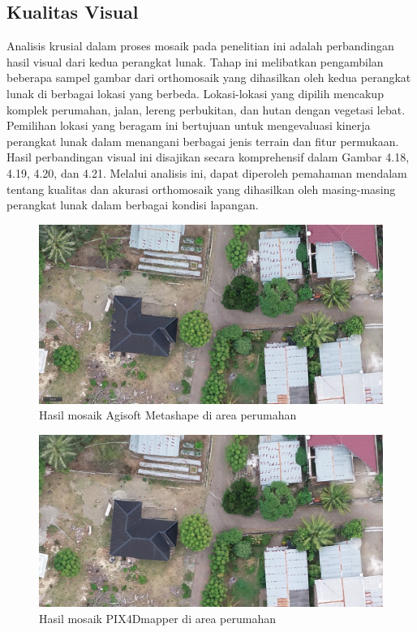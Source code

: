 \subsection{Kualitas Visual}

Analisis krusial dalam proses mosaik pada penelitian ini adalah perbandingan hasil visual dari kedua perangkat lunak. Tahap ini melibatkan pengambilan beberapa sampel gambar dari orthomosaik yang dihasilkan oleh kedua perangkat lunak di berbagai lokasi yang berbeda. Lokasi-lokasi yang dipilih mencakup komplek perumahan, jalan, lereng perbukitan, dan hutan dengan vegetasi lebat. Pemilihan lokasi yang beragam ini bertujuan untuk mengevaluasi kinerja perangkat lunak dalam menangani berbagai jenis terrain dan fitur permukaan. Hasil perbandingan visual ini disajikan secara komprehensif dalam Gambar 4.18, 4.19, 4.20, dan 4.21. Melalui analisis ini, dapat diperoleh pemahaman mendalam tentang kualitas dan akurasi orthomosaik yang dihasilkan oleh masing-masing perangkat lunak dalam berbagai kondisi lapangan.

\begin{figure} [H]
    \centering
    \includegraphics [width=1\linewidth]{image/agisoft perumahan.png}
    \caption{Hasil mosaik Agisoft Metashape di area perumahan}
    \label{visual perumahan 1}
\end{figure}

\begin{figure} [H]
    \centering
    \includegraphics [width=1\linewidth]{image/pix perumahan.png}
    \caption{Hasil mosaik PIX4Dmapper di area perumahan}
    \label{visual perumahan 2}
\end{figure}


